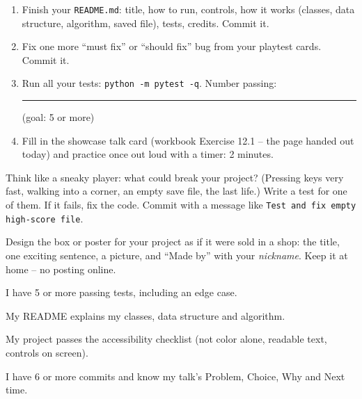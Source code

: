 \namedateline

\begin{core}
\begin{enumerate}[itemsep=1pt]
  \item Finish your \texttt{README.md}: title, how to run, controls, how it works (classes, data structure, algorithm, saved file), tests, credits. Commit it.
  \item Fix one more \enquote{must fix} or \enquote{should fix} bug from your playtest cards. Commit it.
  \item Run all your tests: \texttt{python -m pytest -q}. Number passing: \rule{1.5cm}{0.4pt} (goal: 5 or more)
  \item Fill in the showcase talk card (workbook Exercise 12.1 -- the page handed out today) and practice once out loud with a timer: 2 minutes.
\end{enumerate}
\end{core}

\begin{challenge}
Think like a sneaky player: what could break your project? (Pressing keys very fast, walking into a corner, an empty save file, the last life.) Write a test for one of them. If it fails, fix the code. Commit with a message like \texttt{Test and fix empty high-score file}.
\end{challenge}

\begin{creative}
Design the box or poster for your project as if it were sold in a shop: the title, one exciting sentence, a picture, and \enquote{Made by} with your \emph{nickname}. Keep it at home -- no posting online.
\answerspace{4cm}
\end{creative}

\begin{selfcheck}
  \item I have 5 or more passing tests, including an edge case.
  \item My README explains my classes, data structure and algorithm.
  \item My project passes the accessibility checklist (not color alone, readable text, controls on screen).
  \item I have 6 or more commits and know my talk's Problem, Choice, Why and Next time.
\end{selfcheck}
